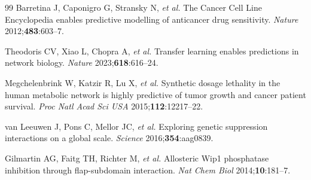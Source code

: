 \documentclass[12pt,a4paper]{article}
\begin{document}
\begin{thebibliography}{99}
Barretina J, Caponigro G, Stransky N, \textit{et al.}
The Cancer Cell Line Encyclopedia enables predictive modelling of anticancer drug sensitivity.
\textit{Nature} 2012;\textbf{483}:603--7.

Theodoris CV, Xiao L, Chopra A, \textit{et al.}
Transfer learning enables predictions in network biology.
\textit{Nature} 2023;\textbf{618}:616--24.

Megchelenbrink W, Katzir R, Lu X, \textit{et al.}
Synthetic dosage lethality in the human metabolic network is highly predictive of tumor growth and cancer patient survival.
\textit{Proc Natl Acad Sci USA} 2015;\textbf{112}:12217--22.

van Leeuwen J, Pons C, Mellor JC, \textit{et al.}
Exploring genetic suppression interactions on a global scale.
\textit{Science} 2016;\textbf{354}:aag0839.

Gilmartin AG, Faitg TH, Richter M, \textit{et al.}
Allosteric Wip1 phosphatase inhibition through flap-subdomain interaction.
\textit{Nat Chem Biol} 2014;\textbf{10}:181--7.

\end{thebibliography}
\end{document}
